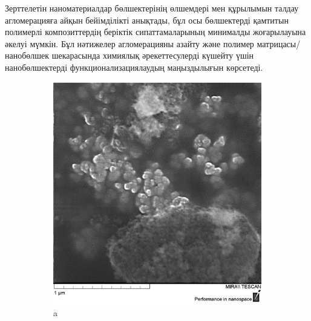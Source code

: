 \begin{multicols}{2}
Зерттелетін наноматериалдар бөлшектерінің өлшемдері мен құрылымын талдау
агломерацияға айқын бейімділікті анықтады, бұл осы бөлшектерді қамтитын
полимерлі композиттердің беріктік сипаттамаларының минималды
жоғарылауына әкелуі мүмкін. Бұл нәтижелер агломерацияны азайту және
полимер матрицасы/нанобөлшек шекарасында химиялық әрекеттесулерді
күшейту үшін нанобөлшектерді функционализациялаудың маңыздылығын
көрсетеді.
\end{multicols}

\begin{figure}[H]
    \centering
    \begin{subfigure}[t]{0.45\textwidth} %
        \centering
        \includegraphics[width=\textwidth]{media/chem/image17}
        \caption*{a}
    \end{subfigure}
    \begin{subfigure}[t]{0.45\textwidth} %
        \centering

\end{subfigure}
\end{figure}
